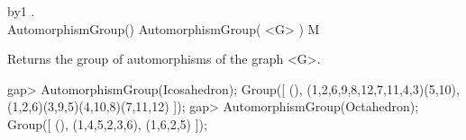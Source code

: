 \advance\xsecno by1
\edef\tempa{\thechapter.\the\xsecno}
\expandafter\writesecline\tempa\\{AutomorphismGroup()}
\>AutomorphismGroup( <G> ) M

Returns the group of automorphisms of the graph <G>.

\beginexample
gap> AutomorphismGroup(Icosahedron);
Group([ (), (1,2,6,9,8,12,7,11,4,3)(5,10), (1,2,6)(3,9,5)(4,10,8)(7,11,12) ]);
gap> AutomorphismGroup(Octahedron);
Group([ (), (1,4,5,2,3,6), (1,6,2,5) ]);
\endexample



